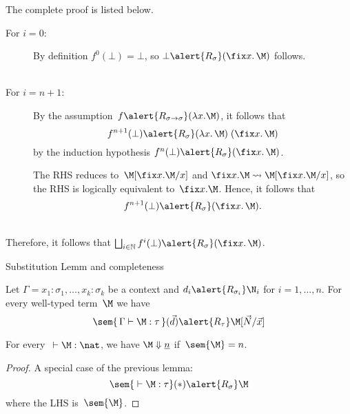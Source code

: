 \begin{frame}
  The complete proof is listed below.
  \begin{description}
    \item[For $i = 0$:] By definition $f^0(\bot) = \bot$, so
      $\bot \alert{\mathrel{R_\sigma}} (\fix x.\, \M)$ follows.
      \\~\\
    \item[For $i = n + 1$:]
      By the assumption~$f\alert{\mathrel{R_{\sigma\to\sigma}}}(\lambda x.\M)$, it
      follows that
      \[
        f^{n+1}(\bot)
        \alert{\mathrel{R_\sigma}} (\lambda x.\,\M)\; (\fix x.\,\M)
      \]
      by the induction hypothesis
      $f^n(\bot) \alert{\mathrel{R_\sigma}} (\fix x.\, \M)$. 

      The RHS reduces to~$\M[\fix x.\M /x]$ and $\fix x.\M \leadsto
      \M[\fix x.\M / x]$, so the RHS is logically equivalent to~$\fix x.\M$.
      Hence, it follows that
      \[
        f^{n+1}(\bot) \alert{\mathrel{R_\sigma}} (\fix x.\,\M).
      \]
  \end{description}
  ~\\
  Therefore, it follows that $\bigsqcup_{i \in \mathbb{N}} f^{i}(\bot)
  \alert{\mathrel{R_\sigma}} (\fix x.\, \M)$. 
\end{frame}
\begin{frame}{Substitution Lemm and completeness}
  \begin{lemma}[Substitution]
    Let $\Gamma = x_1:\sigma_1, \dots, x_k:\sigma_k$ be a context and $d_i
    \alert{\mathrel{R_{\sigma_i}}} \N_i$ for $i = 1, \dots, n$.
    For every well-typed term~$\M$ we have
    \[
      \sem{\, \Gamma \vdash \M : \tau\,}(\vec{d})
      \alert{\mathrel{R_\tau}}
      \M[\vec{N}/\vec{x}]
    \]
  \end{lemma}
  \begin{theorem}[Completeness]
    For every~${}\vdash \M:\nat$, we have $\M \Downarrow \underline{n}$
    if~$\sem{\M} = n$. 
  \end{theorem}
  \begin{proof}
    A special case of the previous lemma:
    \[
      \sem{{}\vdash \M:\tau}(*) \alert{\mathrel{R_\sigma}} \M
    \]
    where the LHS is~$\sem{\M}$.
  \end{proof}
\end{frame}

